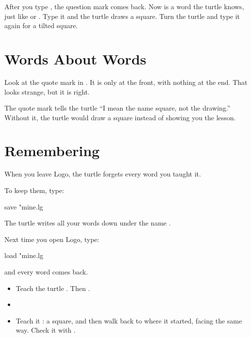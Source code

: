 \documentclass[12pt,oneside,paper=5.5in:8.5in,DIV=11,chapterprefix=false,headings=big]{scrbook}
\begin{document}
After you type ,
the question mark comes back.
Now  is a word the turtle knows,
just like  or .
Type it and the turtle draws a square.
Turn the turtle and type it again
for a tilted square.

\section{Words About Words}

\begin{commandlist}[leftmargin=0.36\linewidth,labelwidth=0.33\linewidth]
\end{commandlist}

Look at the quote mark in .
It is only at the front, with nothing at the end.
That looks strange, but it is right.

The quote mark tells the turtle
``I mean the name square, not the drawing.''
Without it, the turtle would draw a square
instead of showing you the lesson.

\section{Remembering}

When you leave Logo,
the turtle forgets every word you taught it.

To keep them, type:

\begin{code}
save "mine.lg
\end{code}

The turtle writes all your words down
under the name .

Next time you open Logo, type:

\begin{code}
load "mine.lg
\end{code}

and every word comes back.

\begin{trythis}[Try]
\begin{itemize}
\item Teach the turtle . Then .
\item {}
\item Teach it : a square, and then walk back to where it started,
  facing the same way. Check it with .
\end{itemize}
\end{trythis}
\end{document}
